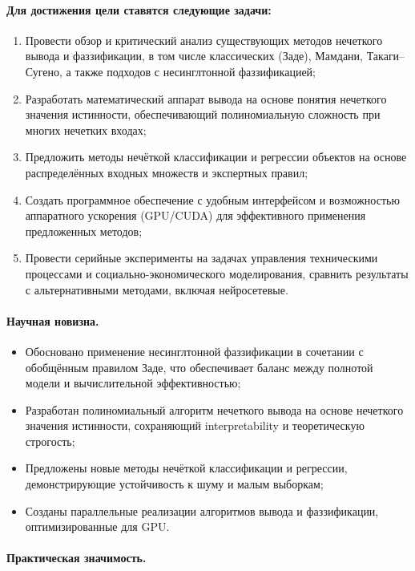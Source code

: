 \paragraph{Для достижения цели ставятся следующие задачи:}
\begin{enumerate}
  \item Провести обзор и критический анализ существующих методов нечеткого вывода и фаззификации, в том числе классических (Заде), Мамдани, Такаги–Сугено, а также подходов с несинглтонной фаззификацией;
  \item Разработать математический аппарат вывода на основе понятия нечеткого значения истинности, обеспечивающий полиномиальную сложность при многих нечетких входах;
  \item Предложить методы нечёткой классификации и регрессии объектов на основе распределённых входных множеств и экспертных правил;
  \item Создать программное обеспечение с удобным интерфейсом и возможностью аппаратного ускорения (GPU/CUDA) для эффективного применения предложенных методов;
  \item Провести серийные эксперименты на задачах управления техническими процессами и социально-экономического моделирования, сравнить результаты с альтернативными методами, включая нейросетевые.
\end{enumerate}

\paragraph{Научная новизна.}

\begin{itemize}
  \item Обосновано применение несинглтонной фаззификации в сочетании с обобщённым правилом Заде, что обеспечивает баланс между полнотой модели и вычислительной эффективностью;
  \item Разработан полиномиальный алгоритм нечеткого вывода на основе нечеткого значения истинности, сохраняющий interpretability и теоретическую строгость;
  \item Предложены новые методы нечёткой классификации и регрессии, демонстрирующие устойчивость к шуму и малым выборкам;
  \item Созданы параллельные реализации алгоритмов вывода и фаззификации, оптимизированные для GPU.
\end{itemize}

\paragraph{Практическая значимость.} 

